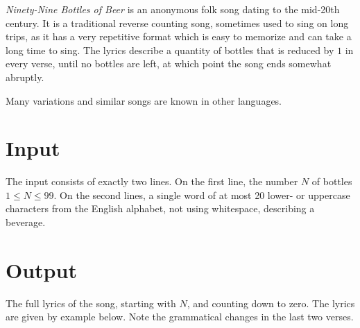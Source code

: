 

\emph{Ninety-Nine Bottles of Beer} is an anonymous folk song dating to the mid-20th century.
It is a traditional reverse counting song, sometimes used to sing on long trips, as it has a very repetitive format which is easy to memorize and can take a long time to sing.
The lyrics describe a quantity of bottles that is reduced by $1$ in every verse, until no bottles are left, at which point the song ends somewhat abruptly.

Many variations and similar songs are known in other languages.

\section*{Input}

The input consists of exactly two lines.
On the first line, the number $N$ of bottles $1\leq N\leq 99$.
On the second lines, a single word of at most 20 lower- or uppercase characters from the English alphabet, not using whitespace, describing a beverage.

\section*{Output}

The full lyrics of the song, starting with $N$, and counting down to zero.
The lyrics are given by example below.
Note the grammatical changes in the last two verses.
